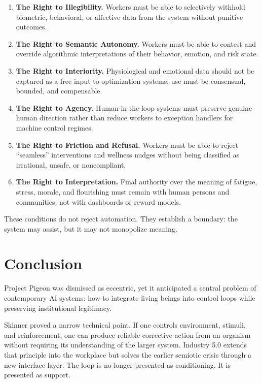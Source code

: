 \documentclass[runningheads]{llncs}
\begin{document}
\begin{enumerate}
\item \textbf{The Right to Illegibility.} Workers must be able to selectively withhold biometric, behavioral, or affective data from the system without punitive outcomes.

\item \textbf{The Right to Semantic Autonomy.} Workers must be able to contest and override algorithmic interpretations of their behavior, emotion, and risk state.

\item \textbf{The Right to Interiority.} Physiological and emotional data should not be captured as a free input to optimization systems; use must be consensual, bounded, and compensable.

\item \textbf{The Right to Agency.} Human-in-the-loop systems must preserve genuine human direction rather than reduce workers to exception handlers for machine control regimes.

\item \textbf{The Right to Friction and Refusal.} Workers must be able to reject ``seamless'' interventions and wellness nudges without being classified as irrational, unsafe, or noncompliant.

\item \textbf{The Right to Interpretation.} Final authority over the meaning of fatigue, stress, morale, and flourishing must remain with human persons and communities, not with dashboards or reward models.
\end{enumerate}

These conditions do not reject automation. They establish a boundary: the system may assist, but it may not monopolize meaning.

\section{Conclusion}

Project Pigeon was dismissed as eccentric, yet it anticipated a central problem of contemporary AI systems: how to integrate living beings into control loops while preserving institutional legitimacy.

Skinner proved a narrow technical point. If one controls environment, stimuli, and reinforcement, one can produce reliable corrective action from an organism without requiring its understanding of the larger system. Industry 5.0 extends that principle into the workplace but solves the earlier semiotic crisis through a new interface layer. The loop is no longer presented as conditioning. It is presented as support.
\end{document}
